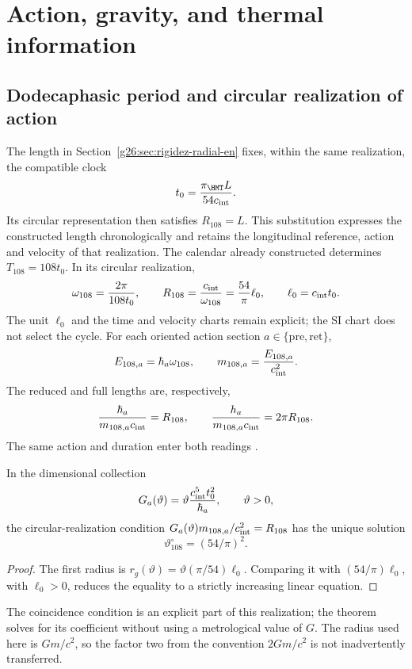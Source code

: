\section{Action, gravity, and thermal information}
\label{sec:gravity}
\subsection{Dodecaphasic period and circular realization of action}
The length in Section~\ref{g26:sec:rigidez-radial-en} fixes, within
the same realization, the compatible clock
\[
 t_0=\frac{\pi_{\HMT}L}{54c_{\rm int}}.
\]
Its circular representation then satisfies \(R_{108}=L\). This
substitution expresses the constructed length chronologically and retains
the longitudinal reference, action and velocity of that realization.
The calendar already constructed determines $T_{108}=108t_0$.
In its circular realization,
\[
\omega_{108}=\frac{2\pi}{108t_0},\qquad
R_{108}=\frac{c_{\rm int}}{\omega_{108}}
=\frac{54}{\pi}\ell_0,\qquad \ell_0=c_{\rm int}t_0.
\]
The unit $\ell_0$ and the time and velocity charts remain
explicit; the SI chart does not select the cycle.
For each oriented action section $a\in\{\mathrm{pre},\mathrm{ret}\}$,
\[
E_{108,a}=\hbar_a\omega_{108},\qquad
m_{108,a}=\frac{E_{108,a}}{c_{\rm int}^2}.
\]
The reduced and full lengths are, respectively,
\[
\frac{\hbar_a}{m_{108,a}c_{\rm int}}=R_{108},
\qquad
\frac{h_a}{m_{108,a}c_{\rm int}}=2\pi R_{108}.
\]
The same action and duration enter both readings
\cite{autodual}.

\begin{proposition}
In the dimensional collection
\[
G_a(\vartheta)=\vartheta\frac{c_{\rm int}^5t_0^2}{\hbar_a},
\qquad \vartheta>0,
\]
the circular-realization condition
$G_a(\vartheta)m_{108,a}/c_{\rm int}^2=R_{108}$
has the unique solution
\[
\vartheta^\circ_{108}=(54/\pi)^2.
\]
\end{proposition}
\begin{proof}
The first radius is
$r_g(\vartheta)=\vartheta(\pi/54)\ell_0$.
Comparing it with $(54/\pi)\ell_0$, with $\ell_0>0$, reduces the
equality to a strictly increasing linear equation.
\end{proof}
The coincidence condition is an explicit part of this realization;
the theorem solves for its coefficient without using a metrological value of $G$.
The radius used here is $Gm/c^2$, so the factor two from
the convention $2Gm/c^2$ is not inadvertently transferred.

